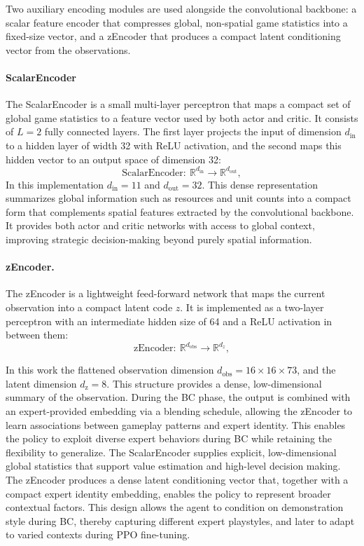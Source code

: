 \documentclass[10pt,twocolumn,letterpaper]{article}
\begin{document}
Two auxiliary encoding modules are used alongside the convolutional backbone: a scalar feature encoder that compresses global, non-spatial game statistics into a fixed-size vector, and a zEncoder that produces a compact latent conditioning vector from the observations.
\paragraph{ScalarEncoder}  
The ScalarEncoder is a small multi-layer perceptron that maps a compact set of global game statistics to a feature vector used by both actor and critic. It consists of \(L=2\) fully connected layers. The first layer projects the input of dimension \(d_{\text{in}}\) to a hidden layer of width 32 with ReLU activation, and the second maps this hidden vector to an output space of dimension 32:
\[
\mathrm{ScalarEncoder}:\ \mathbb{R}^{d_{\text{in}}}\rightarrow\mathbb{R}^{d_{\text{out}}},
\]
In this implementation \(d_{\text{in}}=11\) and \(d_{\text{out}}=32\). This dense representation summarizes global information such as resources and unit counts into a compact form that complements spatial features extracted by the convolutional backbone. It provides both actor and critic networks with access to global context, improving strategic decision-making beyond purely spatial information.

\paragraph{zEncoder.}  
The zEncoder is a lightweight feed-forward network that maps the current observation into a compact latent code \(z\). It is implemented as a two-layer perceptron with an intermediate hidden size of 64 and a ReLU activation in between them:
\[
\mathrm{zEncoder}:\ \mathbb{R}^{d_{\text{obs}}}\rightarrow\mathbb{R}^{d_z},
\]

In this work the flattened observation dimension \(d_{\text{obs}}=16\times16\times73\), and the latent dimension \(d_{\text{z}}=8\). This structure provides a dense, low-dimensional summary of the observation. During the BC phase, the output is combined with an expert-provided embedding via a blending schedule, allowing the zEncoder to learn associations between gameplay patterns and expert identity.  This enables the policy to exploit diverse expert behaviors during BC while retaining the flexibility to generalize.
\vspace{10pt}
The ScalarEncoder supplies explicit, low-dimensional global statistics that support value estimation and high-level decision making. The zEncoder produces a dense latent conditioning vector that, together with a compact expert identity embedding, enables the policy to represent broader contextual factors. This design allows the agent to condition on demonstration style during BC, thereby capturing different expert playstyles, and later to adapt to varied contexts during PPO fine-tuning.
\end{document}
